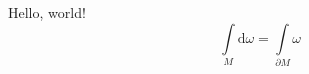 \documentclass[a4paper, 12pt]{article}
\begin{document}
    Hello, world!
    \[
        \int\limits_{M} \mathrm{d}\omega = \int\limits_{\partial M} \omega
    \]
\end{document}
